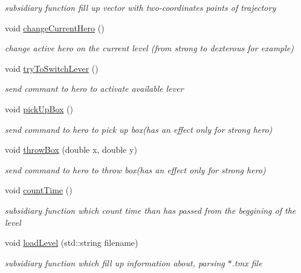 \begin{DoxyCompactItemize}
\begin{DoxyCompactList}\small\item\em subsidiary function fill up vector with two-\/coordinates points of trajectory \end{DoxyCompactList}\item 
\mbox{\label{class_level_a4d1a3f12d428bf22faa547fa170df275}} 
void \hyperlink{class_level_a4d1a3f12d428bf22faa547fa170df275}{change\+Current\+Hero} ()
\begin{DoxyCompactList}\small\item\em change active hero on the current level (from strong to dexterous for example) \end{DoxyCompactList}\item 
\mbox{\label{class_level_ab82d5f8bcf7c4e630d7e166b2a78e3aa}} 
void \hyperlink{class_level_ab82d5f8bcf7c4e630d7e166b2a78e3aa}{try\+To\+Switch\+Lever} ()
\begin{DoxyCompactList}\small\item\em send commant to hero to activate available lever \end{DoxyCompactList}\item 
\mbox{\label{class_level_aa52fdbf5c43c826b21b640cc53d11d1b}} 
void \hyperlink{class_level_aa52fdbf5c43c826b21b640cc53d11d1b}{pick\+Up\+Box} ()
\begin{DoxyCompactList}\small\item\em send command to hero to pick up box(has an effect only for strong hero) \end{DoxyCompactList}\item 
void \hyperlink{class_level_a911bba94df90e7adabac1a5a0519ea47}{throw\+Box} (double x, double y)
\begin{DoxyCompactList}\small\item\em send command to hero to throw box(has an effect only for strong hero) \end{DoxyCompactList}\item 
\mbox{\label{class_level_afd0bf2f408a9871d56e386d7a7dced72}} 
void \hyperlink{class_level_afd0bf2f408a9871d56e386d7a7dced72}{count\+Time} ()
\begin{DoxyCompactList}\small\item\em subsidiary function which count time than has passed from the beggining of the level \end{DoxyCompactList}\item 
void \hyperlink{class_level_a362e4dcf6ae7fdad3c186246b2b7c355}{load\+Level} (std\+::string filename)
\begin{DoxyCompactList}\small\item\em subsidiary function which fill up information about, parsing $\ast$.tmx file \end{DoxyCompactList}\end{DoxyCompactItemize}
